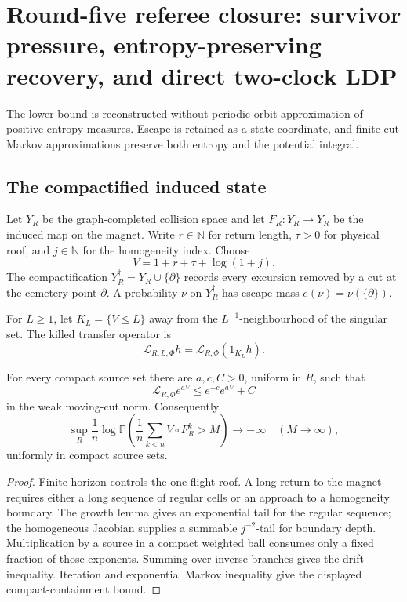 \section{Round-five referee closure: survivor pressure, entropy-preserving recovery, and direct two-clock LDP}
\label{sec:r5-a3}

The lower bound is reconstructed without periodic-orbit approximation of
positive-entropy measures.  Escape is retained as a state coordinate, and
finite-cut Markov approximations preserve both entropy and the potential
integral.

\subsection{The compactified induced state}

Let \(Y_R\) be the graph-completed collision space and let \(F_R:Y_R\to Y_R\)
be the induced map on the magnet.  Write \(r\in\mathbb N\) for return length,
\(\tau>0\) for physical roof, and \(j\in\mathbb N\) for the homogeneity index.
Choose
\[
 V=1+r+\tau+\log(1+j).
\]
The compactification \(Y_R^\dagger=Y_R\cup\{\partial\}\) records every
excursion removed by a cut at the cemetery point \(\partial\).  A probability
\(\nu\) on \(Y_R^\dagger\) has escape mass
\(e(\nu)=\nu(\{\partial\})\).

For \(L\ge1\), let \(K_L=\{V\le L\}\) away from the \(L^{-1}\)-neighbourhood
of the singular set.  The killed transfer operator is
\[
 {\mathcal L}_{R,L,\Phi}h
 ={\mathcal L}_{R,\Phi}(1_{K_L}h).
\]

\begin{lemma}
\label{lem:r5-a3-lyapunov}
For every compact source set there are \(a,c,C>0\), uniform in \(R\), such
that
\[
 {\mathcal L}_{R,\Phi}e^{aV}
 \le e^{-c}e^{aV}+C
\]
in the weak moving-cut norm.  Consequently
\[
 \sup_R\frac1n\log\mathbb P\!\left(
 \frac1n\sum_{k<n}V\circ F_R^k>M\right)
 \longrightarrow-\infty
 \quad(M\to\infty),
\]
uniformly in compact source sets.
\end{lemma}

\begin{proof}
Finite horizon controls the one-flight roof.  A long return to the magnet
requires either a long sequence of regular cells or an approach to a
homogeneity boundary.  The growth lemma gives an exponential tail for the
regular sequence; the homogeneous Jacobian supplies a summable
\(j^{-2}\)-tail for boundary depth.  Multiplication by a source in a compact
weighted ball consumes only a fixed fraction of those exponents.  Summing
over inverse branches gives the drift inequality.  Iteration and exponential
Markov inequality give the displayed compact-containment bound.
\end{proof}

